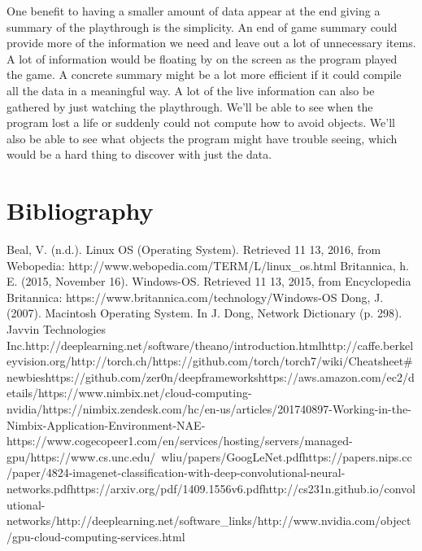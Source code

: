\documentclass{scrreprt}
\begin{document}
One benefit to having a smaller amount of data appear at the end giving a summary of the playthrough is the simplicity.
An end of game summary could provide more of the information we need and leave out a lot of unnecessary items.
A lot of information would be floating by on the screen as the program played the game.
A concrete summary might be a lot more efficient if it could compile all the data in a meaningful way.
A lot of the live information can also be gathered by just watching the playthrough.
We'll be able to see when the program lost a life or suddenly could not compute how to avoid objects.
We'll also be able to see what objects the program might have trouble seeing, which would be a hard thing to discover with just the data.






\chapter{Bibliography}

Beal, V. (n.d.). Linux OS (Operating System). Retrieved 11 13, 2016, from Webopedia:
http://www.webopedia.com/TERM/L/linux_os.html\newline
Britannica, h. E. (2015, November 16). Windows-OS. Retrieved 11 13, 2015, from Encyclopedia
Britannica: https://www.britannica.com/technology/Windows-OS\newline
Dong, J. (2007). Macintosh Operating System. In J. Dong, Network Dictionary (p. 298). Javvin
Technologies Inc.\newline
[1] http://deeplearning.net/software/theano/introduction.html\newline
[2] http://caffe.berkeleyvision.org/\newline
[3] http://torch.ch/\newline
[4] https://github.com/torch/torch7/wiki/Cheatsheet\#newbies\newline
[5] https://github.com/zer0n/deepframeworks\newline
[6] https://aws.amazon.com/ec2/details/\newline
[7] https://www.nimbix.net/cloud-computing-nvidia/\newline
[8] https://nimbix.zendesk.com/hc/en-us/articles/201740897-Working-in-the-Nimbix-Application-Environment-NAE-\newline
[9] https://www.cogecopeer1.com/en/services/hosting/servers/managed-gpu/\newline
[10] https://www.cs.unc.edu/~wliu/papers/GoogLeNet.pdf\newline
[11] https://papers.nips.cc/paper/4824-imagenet-classification-with-deep-convolutional-neural-networks.pdf\newline
[12] https://arxiv.org/pdf/1409.1556v6.pdf\newline
[13] http://cs231n.github.io/convolutional-networks/\newline
[14] http://deeplearning.net/software_links/\newline
[15] http://www.nvidia.com/object/gpu-cloud-computing-services.html\newline
\end{document}
